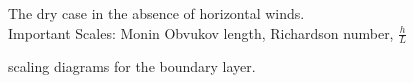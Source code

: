 The dry case in the absence of horizontal winds.\\

Important Scales: Monin Obvukov length, Richardson number, $\frac{h}{L}$

scaling diagrams for the boundary layer.\\
 
 





